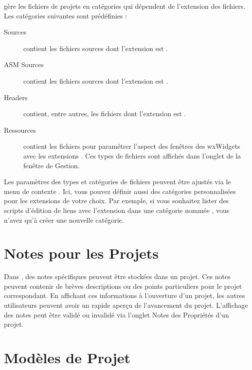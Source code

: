 \codeblocks gère les fichiers de projets en catégories qui dépendent de l'extension des fichiers. Les catégories suivantes sont prédéfinies :

\begin{description}
\item[Sources] contient les fichiers sources dont l'extension est .
\item[ASM Sources] contient les fichiers sources dont l'extension est .
\item[Headers] contient, entre autres, les fichiers dont l'extension est .
\item[Ressources] contient les fichiers pour paramétrer l'aspect des fenêtres des wxWidgets avec les extensions . Ces types de fichiers sont affichés dans l'onglet  de la fenêtre de Gestion.
\end{description}

Les paramètres des types et catégories de fichiers peuvent être ajustés via le menu de contexte . Ici, vous pouvez définir aussi des catégories personnalisées pour les extensions de votre choix. Par exemple, si vous souhaitez lister des scripts d'édition de liens avec l'extension  dans une catégorie nommée , vous n'avez qu'à créer une nouvelle catégorie.


\section{Notes pour les Projets}

Dans \codeblocks, des notes spécifiques peuvent être stockées dans un projet. Ces notes peuvent contenir de brèves descriptions ou des points particuliers pour le projet correspondant. En affichant ces informations à l'ouverture d'un projet, les autres utilisateurs peuvent avoir un rapide aperçu de l'avancement du projet. L'affichage des notes peut être validé ou invalidé via l'onglet Notes des Propriétés d'un projet.

\section{Modèles de Projet}


